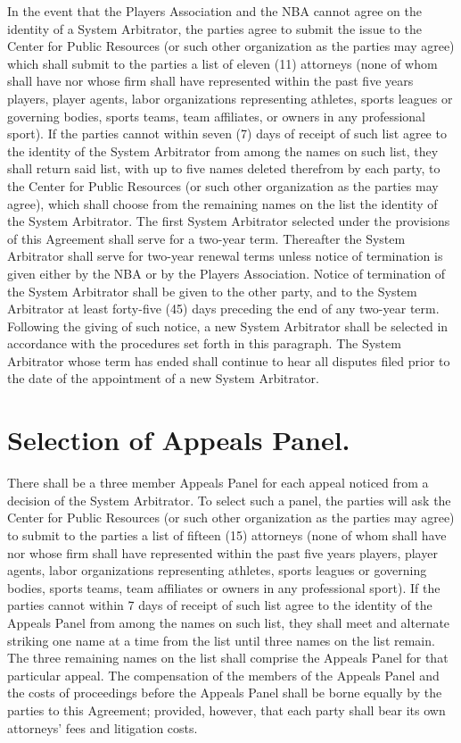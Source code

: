 \documentclass[
]{book}
\begin{document}
In the event that the Players Association and the NBA cannot agree on the identity of a System Arbitrator, the parties agree to submit the issue to the Center for Public Resources (or such other organization as the parties may agree) which shall submit to the parties a list of eleven (11) attorneys (none of whom shall have nor whose firm shall have represented within the past five years players, player agents, labor organizations representing athletes, sports leagues or governing bodies, sports teams, team affiliates, or owners in any professional sport). If the parties cannot within seven (7) days of receipt of such list agree to the identity of the System Arbitrator from among the names on such list, they shall return said list, with up to five names deleted therefrom by each party, to the Center for Public Resources (or such other organization as the parties may agree), which shall choose from the remaining names on the list the identity of the System Arbitrator. The first System Arbitrator selected under the provisions of this Agreement shall serve for a two-year term. Thereafter the System Arbitrator shall serve for two-year renewal terms unless notice of termination is given either by the NBA or by the Players Association. Notice of termination of the System Arbitrator shall be given to the other party, and to the System Arbitrator at least forty-five (45) days preceding the end of any two-year term. Following the giving of such notice, a new System Arbitrator shall be selected in accordance with the procedures set forth in this paragraph. The System Arbitrator whose term has ended shall continue to hear all disputes filed prior to the date of the appointment of a new System Arbitrator.

\hypertarget{selection-of-appeals-panel.}{%
\section{Selection of Appeals Panel.}\label{selection-of-appeals-panel.}}

There shall be a three member Appeals Panel for each appeal noticed from a decision of the System Arbitrator. To select such a panel, the parties will ask the Center for Public Resources (or such other organization as the parties may agree) to submit to the parties a list of fifteen (15) attorneys (none of whom shall have nor whose firm shall have represented within the past five years players, player agents, labor organizations representing athletes, sports leagues or governing bodies, sports teams, team affiliates or owners in any professional sport). If the parties cannot within 7 days of receipt of such list agree to the identity of the Appeals Panel from among the names on such list, they shall meet and alternate striking one name at a time from the list until three names on the list remain. The three remaining names on the list shall comprise the Appeals Panel for that particular appeal. The compensation of the members of the Appeals Panel and the costs of proceedings before the Appeals Panel shall be borne equally by the parties to this Agreement; provided, however, that each party shall bear its own attorneys' fees and litigation costs.
\end{document}
